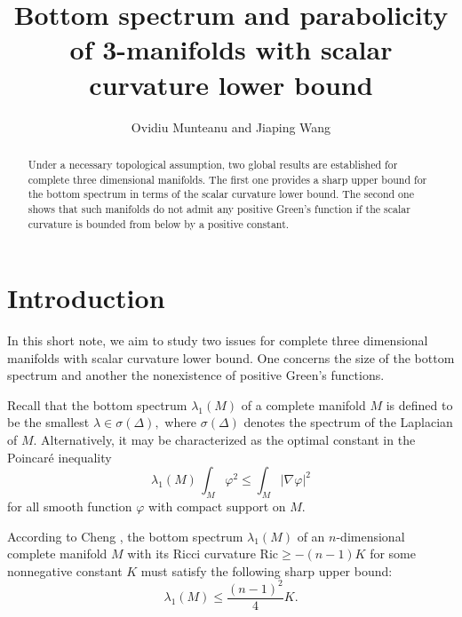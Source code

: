 \documentclass{amsart}
\numberwithin{equation}{section}
\begin{document}
\title[Bottom spectrum and parabolicity of 3-manifolds]{Bottom spectrum and parabolicity of 3-manifolds with scalar curvature lower bound}

\begin{abstract}
Under a necessary topological assumption, two global results are established for complete three dimensional manifolds. The first one
provides a sharp upper bound for the bottom spectrum in terms of the scalar curvature lower bound. The second one shows that such manifolds 
do not admit any positive Green's function if the scalar curvature is bounded from below by a positive constant.
\end{abstract}

\author{Ovidiu Munteanu and Jiaping Wang}

\address{Department of Mathematics, University of Connecticut, Storrs, CT
06268, USA}
\address{School of Mathematics, University of Minnesota, Minneapolis, MN
55455, USA}

\maketitle

\section{Introduction}

In this short note, we aim to study two issues for 
complete three dimensional manifolds with scalar curvature
lower bound. One concerns the size of the 
bottom spectrum and another the nonexistence of positive Green's functions.

Recall that the bottom spectrum $\lambda _{1}\left( M\right) $ of a complete manifold $M$
is defined to be the smallest 
$\lambda \in \sigma(\Delta),$ where $\sigma(\Delta)$ denotes the spectrum of the Laplacian of $M.$
Alternatively, it may be characterized as the optimal constant in the  Poincar\'e inequality
\begin{equation*}
\lambda _{1}\left( M\right)\,\int_{M}\varphi ^{2}\leq \int_{M}\left\vert \nabla \varphi \right\vert ^{2}
\end{equation*}
for all smooth function $\varphi$ with compact support on $M.$

According to Cheng \cite{C}, the bottom spectrum $\lambda_1(M)$ of an $n$-dimensional complete manifold $M$ with its
Ricci curvature $\mathrm{Ric}\geq -\left( n-1\right) K$ for some nonnegative
constant $K$ must satisfy the following sharp upper bound:
\begin{equation*}
\lambda _{1}\left( M\right) \leq \frac{\left( n-1\right) ^{2}}{4}K.
\end{equation*}
\end{document}
